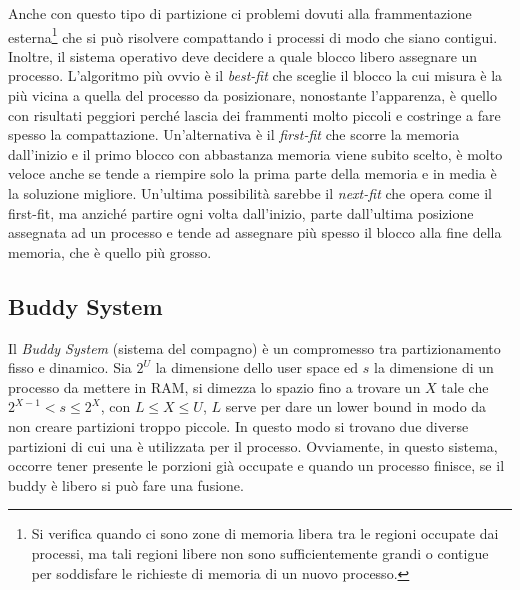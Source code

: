 Anche con questo tipo di partizione ci problemi dovuti alla frammentazione esterna\footnote{Si verifica quando ci sono zone di memoria libera tra le regioni occupate dai processi, ma tali regioni libere non sono sufficientemente grandi o contigue per soddisfare le richieste di memoria di un nuovo processo.} che si può risolvere compattando i processi di modo che siano contigui. Inoltre, il sistema operativo deve decidere a quale blocco libero assegnare un processo. L'algoritmo più ovvio è il \textit{best-fit} che sceglie il blocco la cui misura è la più vicina a quella del processo da posizionare, nonostante l'apparenza, è quello con risultati peggiori perché lascia dei frammenti molto piccoli e costringe a fare spesso la compattazione. Un'alternativa è il \textit{first-fit} che scorre la memoria dall'inizio e il primo blocco con abbastanza memoria viene subito scelto, è molto veloce anche se tende a riempire solo la prima parte della memoria e in media è la soluzione migliore. Un'ultima possibilità sarebbe il \textit{next-fit} che opera come il first-fit, ma anziché partire ogni volta dall'inizio, parte dall'ultima posizione assegnata ad un processo e tende ad assegnare più spesso il blocco alla fine della memoria, che è quello più grosso.

\subsection*{Buddy System}
Il \textit{Buddy System} (sistema del compagno) è un compromesso tra partizionamento fisso e dinamico. Sia $2^U$ la dimensione dello user space ed $s$ la dimensione di un processo da mettere in RAM, si dimezza lo spazio fino a trovare un $X$ tale che $2^{X-1}<s\leq 2^X$, con $L\leq X\leq U$, $L$ serve per dare un lower bound in modo da non creare partizioni troppo piccole. In questo modo si trovano due diverse partizioni di cui una è utilizzata per il processo. Ovviamente, in questo sistema, occorre tener presente le porzioni già occupate e quando un processo finisce, se il buddy è libero si può fare una fusione.

